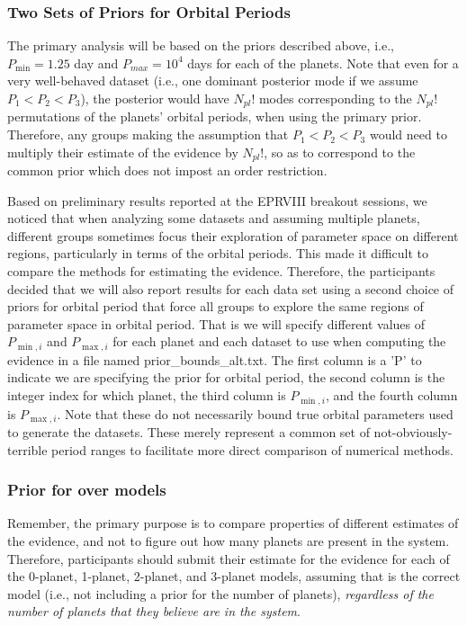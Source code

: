 \documentclass{article}
\begin{document}
\subsubsection{Two Sets of Priors for Orbital Periods}
\label{secAltPriorPeriods}
%
The primary analysis will be based on the priors described above, i.e., $P_{\min}=1.25$ day and $P_{max}=10^4$ days for each of the planets.  Note that even for a very well-behaved dataset (i.e., one dominant posterior mode if we assume $P_1<P_2<P_3$), the posterior would have $N_{pl}!$ modes corresponding to the $N_{pl}!$ permutations of the planets' orbital periods, when using the primary prior.  Therefore, any groups making the assumption that $P_1<P_2<P_3$ would need to multiply their estimate of the evidence by $N_{pl}!$, so as to correspond to the common prior which does not impost an order restriction.  

Based on preliminary results reported at the EPRVIII breakout sessions, we noticed that when analyzing some datasets and assuming multiple planets, different groups sometimes focus their exploration of parameter space on different regions, particularly in terms of the orbital periods.  This made it difficult to compare the methods for estimating the evidence.  Therefore, the participants decided that we will also report results for each data set using a second choice of priors for orbital period that force all groups to explore the same regions of parameter space in orbital period.  That is we will specify different values of $P_{\min,i}$ and $P_{\max,i}$ for each planet and each dataset to use when computing the evidence in a file named prior\_bounds\_alt.txt.  The first column is a 'P' to indicate we are specifying the prior for orbital period, the second column is the integer index for which planet, the third column is $P_{\min,i}$, and the fourth column is $P_{\max,i}$.  Note that these do not necessarily bound true orbital parameters used to generate the datasets.  These merely represent a common set of not-obviously-terrible period ranges to facilitate more direct comparison of numerical methods.  

\subsubsection{Prior for over models}
Remember, the primary purpose is to compare properties of different estimates of the evidence, and not to figure out how many planets are present in the system.  
Therefore, participants should submit their estimate for the evidence for each of the 0-planet, 1-planet, 2-planet, and 3-planet models, assuming that is the correct model (i.e., not including a prior for the number of planets), {\em regardless of the number of planets that they believe are in the system}.  
\end{document}
